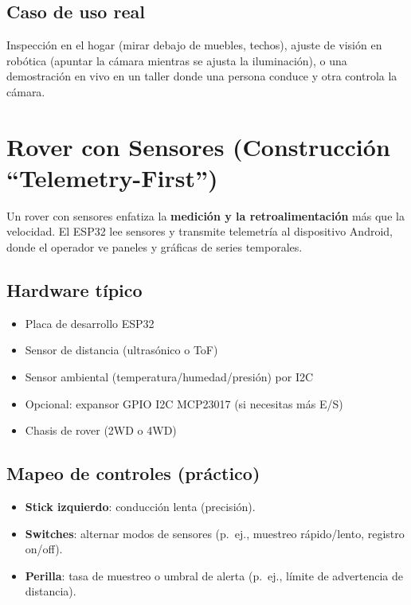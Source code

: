 \subsection*{Caso de uso real}
Inspección en el hogar (mirar debajo de muebles, techos), ajuste de visión en robótica (apuntar la cámara mientras se ajusta la iluminación), o una demostración en vivo en un taller donde una persona conduce y otra controla la cámara.

\section{Rover con Sensores (Construcción “Telemetry-First”)}
\label{sec:example-sensor-rover}

Un rover con sensores enfatiza la \textbf{medición y la retroalimentación} más que la velocidad. El ESP32 lee sensores y transmite telemetría al dispositivo Android, donde el operador ve paneles y gráficas de series temporales.

\subsection*{Hardware típico}
\begin{itemize}
    \item Placa de desarrollo ESP32
    \item Sensor de distancia (ultrasónico o ToF)
    \item Sensor ambiental (temperatura/humedad/presión) por I2C
    \item Opcional: expansor GPIO I2C MCP23017 (si necesitas más E/S)
    \item Chasis de rover (2WD o 4WD)
\end{itemize}

\subsection*{Mapeo de controles (práctico)}
\begin{itemize}
    \item \textbf{Stick izquierdo}: conducción lenta (precisión).
    \item \textbf{Switches}: alternar modos de sensores (p.\ ej., muestreo rápido/lento, registro on/off).
    \item \textbf{Perilla}: tasa de muestreo o umbral de alerta (p.\ ej., límite de advertencia de distancia).
\end{itemize}

